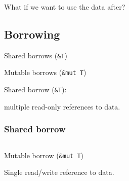 \documentclass{beamer}
\begin{document}
\begin{frame}
    \inputminted[fontsize=\scriptsize]{rust}{code/ownership.rs}
\end{frame}

\begin{frame}
    \inputminted[fontsize=\scriptsize]{rust}{code/ownership2.rs}
\end{frame}

\begin{frame}
    \inputminted[fontsize=\scriptsize]{rust}{code/ownership3.rs}
\end{frame}

\begin{frame}
    \begin{center}
        What if we want to use the data after?
    \end{center}
\end{frame}

\subsection{Borrowing}

\begin{frame}
    \begin{center}
        Shared borrows (\texttt{\&T})

        \vspace{3em}

        Mutable borrows (\texttt{\&mut T})
    \end{center}
\end{frame}

\begin{frame}
    \begin{center}
        Shared borrow (\texttt{\&T}):

        \vspace{3em}

        multiple read-only references to data.
    \end{center}
\end{frame}

\begin{frame}
    \frametitle{Shared borrow}
    \inputminted[fontsize=\scriptsize]{rust}{code/shared_borrow.rs}
\end{frame}

\begin{frame}
    \begin{center}
        Mutable borrow (\texttt{\&mut T})

        \vspace{3em}

        Single read/write reference to data.
    \end{center}
\end{frame}
\end{document}
